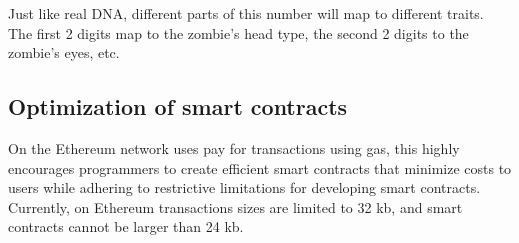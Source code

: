 \documentclass[12pt,tightenlines,letterpaper]{scrartcl}
\begin{document}
Just like real DNA, different parts of this number will map to different traits. The first 2 digits map to the zombie's head type, the second 2 digits to the zombie's eyes, etc.


  
 \subsection{Optimization of smart contracts}
 
 On the \gls{Ethereum} network uses pay for transactions using \gls{gas}, this highly encourages programmers to create efficient \glspl{smart contract} that minimize costs to users while adhering to restrictive limitations for developing smart contracts. Currently, on Ethereum transactions sizes are limited to 32 kb, and \glspl{smart contract} cannot be larger than 24 kb.
 
\end{document}
